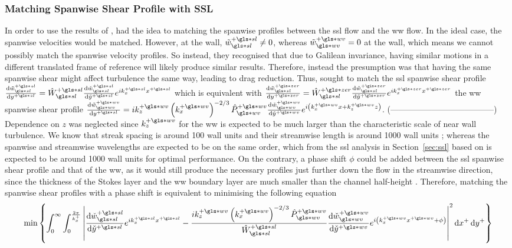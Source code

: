 \subsubsection{Matching Spanwise Shear Profile with SSL}
In order to use the results of \textcite{viotti2009}, \textcite{chernyshenko2013} had the idea to matching the spanwise profiles between the \gls{ssl} flow and the \gls{ww} flow. In the ideal case, the spanwise velocities would be matched. However, at the wall, $\tilde{w}\ps\ssl\neq0$, whereas $\tilde{w}\pw\ww=0$ at the wall, which means we cannot possibly match the spanwise velocity profiles. So instead, they recognised that due to Galilean invariance, having similar motions in a different translated frame of reference will likely produce similar results. Therefore, instead the presumption was that having the same spanwise shear might affect turbulence the same way, leading to drag reduction. Thus, \textcite{chernyshenko2013} sought to match the \gls{ssl} spanwise shear profile $\dv{\tilde{w}\ps\ssl}{y\ps} =\hat{W}\ps\ssl\dv{\check{w}\ps\ssl}{\check{y}\ps} e^{ik_x\ps x\ps}$ which is equivalent with
$\dv{\tilde{w}\pz\ssl}{y\pz} =\hat{W}\pz\ssl\dv{\check{w}\pz\ssl}{\check{y}\pz} e^{ik_x\pz x\pz}$
the \gls{ww} spanwise shear profile $\dv{\tilde{w}\pw\ww}{y\ps}=ik_z\pw \left( k_x\pw \right) ^{-2 /3} \hat{P}\pw\ww \dv{\check{w}\pw\ww}{\check{y}\pw}  e^{i\left( k_x\pw x+k_z \pw z \right) }$. (--------------------------------------) Dependence on $z$ was neglected since $k_z\pw$ for the  \gls{ww} is expected to be much larger than the characteristic scale of near wall turbulence. We know that streak spacing is around 100 wall units and their streamwise length is around 1000 wall units \cite{chernyshenko2005}; whereas the spanwise and streamwise wavelengths are expected to be on the same order, which from the \gls{ssl} analysis in Section~\ref{sec:ssl} based on \textcite{viotti2009} is expected to be around 1000 wall units for optimal performance. On the contrary, a phase shift $\phi $ could be added between the \gls{ssl} spanwise shear profile and that of the \gls{ww}, as it would still produce the necessary profiles just further down the flow in the streamwise direction, since the thickness of the Stokes layer and the \gls{ww} boundary layer are much smaller than the channel half-height \cite{ghebali2017}. Therefore, matching the spanwise shear profiles with a phase shift is equivalent to minimising the following equation
\begin{equation}
	\min \left\{ \int_{0}^{\infty} \int_{0}^{\frac{2\pi}{k_x^{+}}} \left| \dv{\check{w}\ps\ssl}{\check{y}\ps} e^{ik_x\ps x\ps} - \frac{ik_z\pw \left( k_x\pw \right) ^{-2 /3}\hat{P}\pw\ww }{\hat{W}\ps\ssl} \dv{\check{w}\pw\ww}{\check{y}\pw}  e^{i\left(k_x\pw x\pw+\phi \right)} \right|^2 \dd{x^{+}} \dd{y^{+}}  \right\}\label{eq:minshear}
\end{equation}
